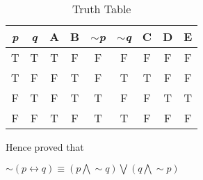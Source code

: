 \documentclass{article}
\begin{document}
\maketitle  
\begin{table}[h]
\centering
\begin{tabular}{|c|c|c|c|c|c|c|c|c|}
\hline
\textit{\textbf{p}} & \textit{\textbf{q}} & \textbf{A} & \textbf{B} & \textit{\textbf{$\sim$p}} & \textit{\textbf{$\sim$q}} & \textbf{C} & \textbf{D} & \textbf{E} \\ \hline
T                   & T                   & T          & F          & F                         & F                         & F          & F          & F          \\
T                   & F                   & F          & T          & F                         & T                         & T          & F          & F          \\
F                   & T                   & F          & T          & T                         & F                         & F          & T          & T          \\
F                   & F                   & T          & F          & T                         & T                         & F          & F          & F          \\ \hline
\end{tabular}
\caption{Truth Table}
\label{tab:table1}
\end{table}
  
 Hence proved that
 
 $ \sim(p \leftrightarrow q) \equiv    {(p \bigwedge  \sim q) \bigvee (q \bigwedge \sim p) }$
    
   
\end{document}

